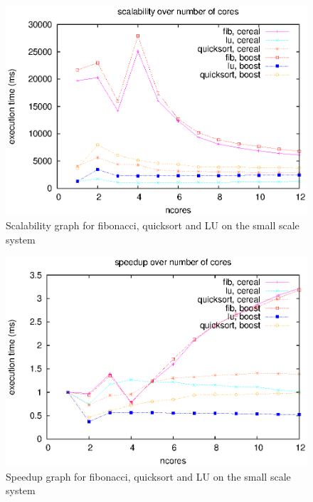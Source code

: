 \begin{figure}[!ht]
\centering
\includegraphics[width=0.7\columnwidth]{figures/apps_scalability_minititan_cereal}
\caption{Scalability graph for fibonacci, quicksort and LU on the small scale system}
\label{fig:apps_scalability_minititan_cereal}
\end{figure}

\begin{figure}[!ht]
\centering
\includegraphics[width=0.7\columnwidth]{figures/apps_speedup_minititan_cereal}
\caption{Speedup graph for fibonacci, quicksort and LU on the small scale system}
\label{fig:apps_speedup_minititan_cereal}
\end{figure}


